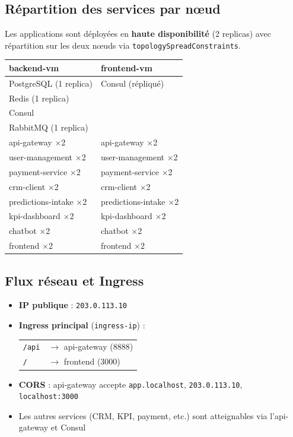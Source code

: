 \documentclass[11pt,a4paper]{article}
\begin{document}
\subsection{Répartition des services par nœud}

Les applications sont déployées en \textbf{haute disponibilité} (2 replicas) avec répartition sur les deux nœuds via \texttt{topologySpreadConstraints}.

\begin{center}
\begin{tabular}{@{}p{5cm}p{6cm}@{}}
\toprule
\textbf{backend-vm} & \textbf{frontend-vm} \\
\midrule
PostgreSQL (1 replica) & Consul (répliqué) \\
Redis (1 replica)     & \\
Consul               & \\
RabbitMQ (1 replica) & \\
\midrule
api-gateway $\times$2     & api-gateway $\times$2 \\
user-management $\times$2 & user-management $\times$2 \\
payment-service $\times$2 & payment-service $\times$2 \\
crm-client $\times$2      & crm-client $\times$2 \\
predictions-intake $\times$2 & predictions-intake $\times$2 \\
kpi-dashboard $\times$2   & kpi-dashboard $\times$2 \\
chatbot $\times$2         & chatbot $\times$2 \\
frontend $\times$2        & frontend $\times$2 \\
\bottomrule
\end{tabular}
\end{center}

\subsection{Flux réseau et Ingress}

\begin{itemize}[noitemsep]
  \item \textbf{IP publique} : \texttt{203.0.113.10}
  \item \textbf{Ingress principal} (\texttt{ingress-ip}) : \\
  \begin{tabular}{ll}
    \texttt{/api} & $\rightarrow$ api-gateway (8888) \\
    \texttt{/}    & $\rightarrow$ frontend (3000)   \\
  \end{tabular}
  \item \textbf{CORS} : api-gateway accepte \texttt{app.localhost}, \texttt{203.0.113.10}, \texttt{localhost:3000}
  \item Les autres services (CRM, KPI, payment, etc.) sont atteignables via l’api-gateway et Consul
\end{itemize}
\end{document}
